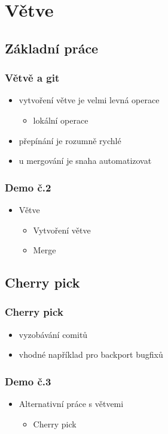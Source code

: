 \documentclass[pdftex]{beamer}
\begin{document}
\section{Větve}
\subsection{Základní práce}

\begin{frame}
	\frametitle{Větvě a git}
	\begin{itemize}
		\item vytvoření větve je velmi levná operace
		\begin{itemize}
			\item lokální operace
		\end{itemize}
		\item přepínání je rozumně rychlé
		\item u mergování je snaha automatizovat
	\end{itemize}
\end{frame}

\begin{frame}
	\frametitle{Demo č.2}
	\begin{itemize}
		\item Větve
		\begin{itemize} \item Vytvoření větve \end{itemize}
  		\begin{itemize} \item Merge \end{itemize}
	\end{itemize}
\end{frame}

\subsection{Cherry pick}

\begin{frame}
	\frametitle{Cherry pick}
	\begin{itemize}
		\item vyzobávání comitů
		\item vhodné například pro backport bugfixů
	\end{itemize}
\end{frame}

\begin{frame}
	\frametitle{Demo č.3}
	\begin{itemize}
		\item Alternativní práce s větvemi
		\begin{itemize} \item Cherry pick \end{itemize}
	\end{itemize}
\end{frame}
\end{document}
